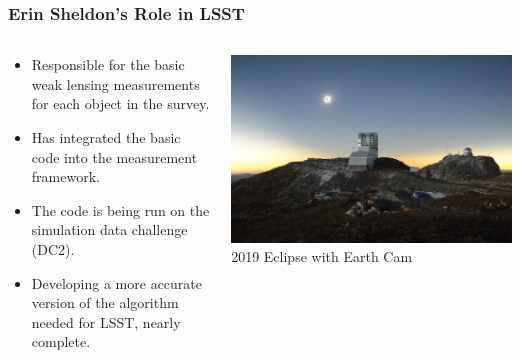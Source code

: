\documentclass[aspectratio=169]{beamer}
\begin{document}
\frame
{

    \frametitle{Erin Sheldon's Role in LSST}


    \begin{columns}

        \begin{column}{0.5\textwidth}
            \begin{itemize}

                \item Responsible for the basic weak lensing measurements for
                    each object in the survey.

                \item Has integrated the basic code into the measurement framework.

                \item The code is being run on the simulation data challenge (DC2).

                \item Developing a more accurate version of the algorithm needed
                    for LSST, nearly complete.

            \end{itemize}

        \end{column}

        \begin{column}{0.5\textwidth}
            \centering
                \includegraphics[height=0.8\textheight]{LSST-eclipse-2019.jpg}
                \newline
                {\tiny 2019 Eclipse with Earth Cam}
        \end{column}

    \end{columns}


}
\end{document}
